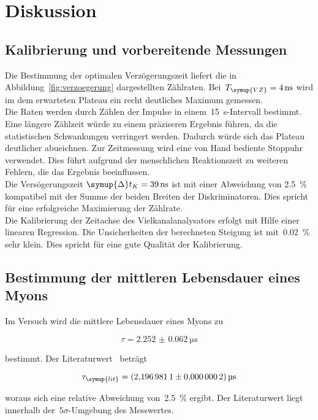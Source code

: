 \section{Diskussion}
\label{sec:diskussion}

\subsection{Kalibrierung und vorbereitende Messungen}
Die Bestimmung der optimalen Verzögerungszeit liefert die in
Abbildung~\ref{fig:verzoegerung} dargestellten Zählraten.
Bei~$T_{\symup{VZ}}=\SI{4}{\nano\second}$ wird im dem erwarteten Plateau ein recht
deutliches Maximum gemessen.\\
Die Raten werden durch Zählen der Impulse in einem~\SI{15}{\second}-Intervall
bestimmt. Eine längere Zählzeit würde zu einem präziseren Ergebnis führen, da die
statistischen Schwankungen verringert werden. Dadurch würde sich das Plateau
deutlicher abueichnen. Zur Zeitmessung wird eine von Hand bediente Stoppuhr
verwendet. Dies führt aufgrund der menschlichen Reaktionszeit zu weiteren Fehlern,
die das Ergebnis beeinflussen.\\
Die Versögerungszeit $\symup{\Delta}t_K = \SI{39}{\nano\second}$ ist
mit einer Abweichung von \SI{2.5}{\percent} kompatibel mit der Summe der beiden
Breiten der Diskriminatoren. Dies spricht für eine erfolgreiche Maximierung der
Zählrate.\\
Die Kalibrierung der Zeitachse des Vielkanalanalysators erfolgt mit Hilfe einer
linearen Regression. Die Unsicherheiten der berechneten Steigung ist
mit~\SI{0.02}{\percent} sehr klein. Dies spricht für eine gute Qualität der
Kalibrierung.

\subsection{Bestimmung der mittleren Lebensdauer eines Myons}
Im Versuch wird die mittlere Lebensdauer eines Myons zu

\begin{equation}
  \tau=\SI{2.252(62)}{\micro\second}
\end{equation}

bestimmt. Der Literaturwert~\cite{pdg} beträgt

\begin{equation}
  \tau_{\symup{lit}}=\SI{2.1969811(2)}{\micro\second}
\end{equation}

woraus sich eine relative Abweichung von~\SI{2.5}{\percent} ergibt. Der
Literaturwert liegt innerhalb der~$5\sigma$-Umgebung des Messwertes.


